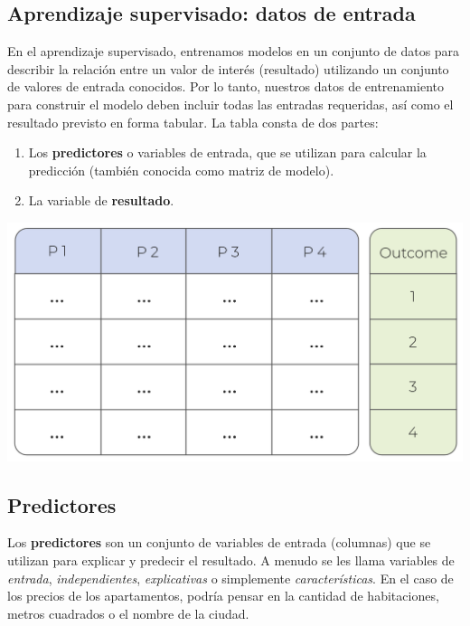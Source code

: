 \documentclass[
]{book}
\providecommand{\tightlist}{%
  \setlength{\itemsep}{0pt}\setlength{\parskip}{0pt}}
\begin{document}
\hypertarget{aprendizaje-supervisado-datos-de-entrada}{%
\subsection{Aprendizaje supervisado: datos de entrada}\label{aprendizaje-supervisado-datos-de-entrada}}

En el aprendizaje supervisado, entrenamos modelos en un conjunto de datos para describir la relación entre un valor de interés (resultado) utilizando un conjunto de valores de entrada conocidos. Por lo tanto, nuestros datos de entrenamiento para construir el modelo deben incluir todas las entradas requeridas, así como el resultado previsto en forma tabular. La tabla consta de dos partes:

\begin{enumerate}
\def\labelenumi{\arabic{enumi}.}
\tightlist
\item
  Los \textbf{predictores} o variables de entrada, que se utilizan para calcular la predicción (también conocida como matriz de modelo).
\item
  La variable de \textbf{resultado}.
\end{enumerate}

\includegraphics{img/tab.png}

\hypertarget{predictores}{%
\subsection{Predictores}\label{predictores}}

Los \textbf{predictores} son un conjunto de variables de entrada (columnas) que se utilizan para explicar y predecir el resultado. A menudo se les llama variables de \emph{entrada}, \emph{independientes}, \emph{explicativas} o simplemente \emph{características}. En el caso de los precios de los apartamentos, podría pensar en la cantidad de habitaciones, metros cuadrados o el nombre de la ciudad.
\end{document}
